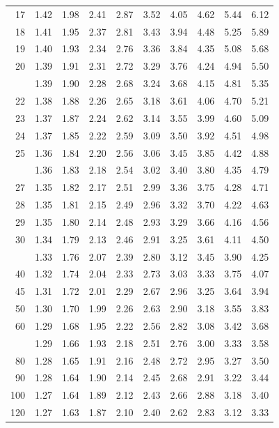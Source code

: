 \documentclass[10pt]{article}
\begin{document}
\begin{longtable}{@{}r!{\vrule width 0.8pt\hspace{0.55em}}rrrrrrrrr@{}}
17 & 1.42 & 1.98 & 2.41 & 2.87 & 3.52 & 4.05 & 4.62 & 5.44 & 6.12 \\
18 & 1.41 & 1.95 & 2.37 & 2.81 & 3.43 & 3.94 & 4.48 & 5.25 & 5.89 \\
19 & 1.40 & 1.93 & 2.34 & 2.76 & 3.36 & 3.84 & 4.35 & 5.08 & 5.68 \\
20 & 1.39 & 1.91 & 2.31 & 2.72 & 3.29 & 3.76 & 4.24 & 4.94 & 5.50 \\
 & 1.39 & 1.90 & 2.28 & 2.68 & 3.24 & 3.68 & 4.15 & 4.81 & 5.35 \\
22 & 1.38 & 1.88 & 2.26 & 2.65 & 3.18 & 3.61 & 4.06 & 4.70 & 5.21 \\
23 & 1.37 & 1.87 & 2.24 & 2.62 & 3.14 & 3.55 & 3.99 & 4.60 & 5.09 \\
24 & 1.37 & 1.85 & 2.22 & 2.59 & 3.09 & 3.50 & 3.92 & 4.51 & 4.98 \\
25 & 1.36 & 1.84 & 2.20 & 2.56 & 3.06 & 3.45 & 3.85 & 4.42 & 4.88 \\
 & 1.36 & 1.83 & 2.18 & 2.54 & 3.02 & 3.40 & 3.80 & 4.35 & 4.79 \\
27 & 1.35 & 1.82 & 2.17 & 2.51 & 2.99 & 3.36 & 3.75 & 4.28 & 4.71 \\
28 & 1.35 & 1.81 & 2.15 & 2.49 & 2.96 & 3.32 & 3.70 & 4.22 & 4.63 \\
29 & 1.35 & 1.80 & 2.14 & 2.48 & 2.93 & 3.29 & 3.66 & 4.16 & 4.56 \\
30 & 1.34 & 1.79 & 2.13 & 2.46 & 2.91 & 3.25 & 3.61 & 4.11 & 4.50 \\
 & 1.33 & 1.76 & 2.07 & 2.39 & 2.80 & 3.12 & 3.45 & 3.90 & 4.25 \\
40 & 1.32 & 1.74 & 2.04 & 2.33 & 2.73 & 3.03 & 3.33 & 3.75 & 4.07 \\
45 & 1.31 & 1.72 & 2.01 & 2.29 & 2.67 & 2.96 & 3.25 & 3.64 & 3.94 \\
50 & 1.30 & 1.70 & 1.99 & 2.26 & 2.63 & 2.90 & 3.18 & 3.55 & 3.83 \\
60 & 1.29 & 1.68 & 1.95 & 2.22 & 2.56 & 2.82 & 3.08 & 3.42 & 3.68 \\
 & 1.29 & 1.66 & 1.93 & 2.18 & 2.51 & 2.76 & 3.00 & 3.33 & 3.58 \\
80 & 1.28 & 1.65 & 1.91 & 2.16 & 2.48 & 2.72 & 2.95 & 3.27 & 3.50 \\
90 & 1.28 & 1.64 & 1.90 & 2.14 & 2.45 & 2.68 & 2.91 & 3.22 & 3.44 \\
100 & 1.27 & 1.64 & 1.89 & 2.12 & 2.43 & 2.66 & 2.88 & 3.18 & 3.40 \\
120 & 1.27 & 1.63 & 1.87 & 2.10 & 2.40 & 2.62 & 2.83 & 3.12 & 3.33 \\

\end{longtable}
\end{document}
